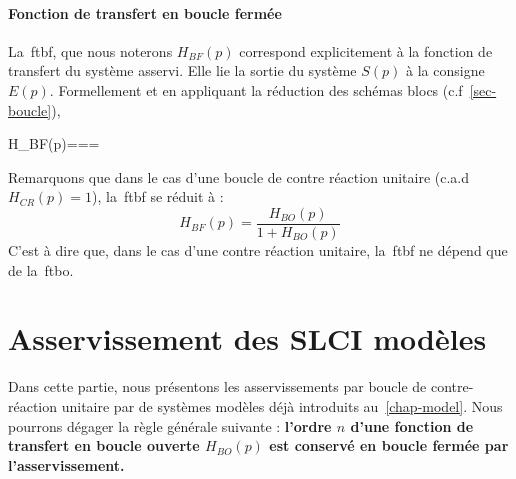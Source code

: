 \paragraph{Fonction de transfert en boucle fermée}
La~\gls{ftbf}, que nous noterons $H_{BF}(p)$ correspond
explicitement à la fonction de transfert du système asservi. 
Elle lie la sortie du système $S(p)$ à la consigne $E(p)$. Formellement et en 
appliquant la réduction des schémas blocs (c.f~\cref{sec-boucle}),
\begin{bequation}
    H_{BF}(p)===
\end{bequation}
Remarquons que dans le cas d'une boucle de contre réaction unitaire 
(c.a.d $H_{CR}(p)=1$), la~\gls{ftbf} se réduit à :
\[
H_{BF}(p)=\dfrac{H_{BO}(p)}{1+H_{BO}(p)}
\]
C'est à dire que, dans le cas d'une contre réaction unitaire, la~\gls{ftbf} ne dépend 
que de la~\gls{ftbo}.
\section{Asservissement des SLCI modèles}
Dans cette partie, nous présentons les asservissements par boucle 
de contre-réaction unitaire par de systèmes modèles déjà introduits 
au~\cref{chap-model}. Nous pourrons dégager la règle générale suivante :
\textbf{l'ordre $n$ d'une fonction de transfert en boucle ouverte $H_{BO}(p)$
est conservé en boucle fermée par l'asservissement.}
